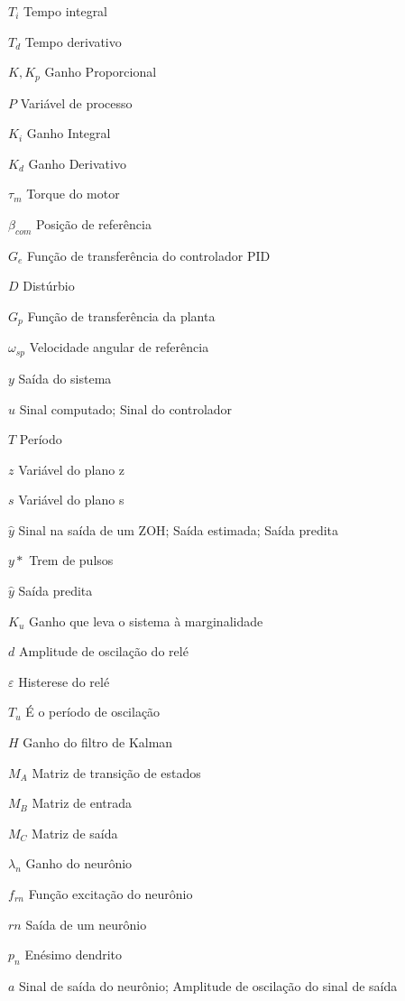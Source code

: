 \begin{simbolos}
  \item[$T_i$] Tempo integral
  \item[$T_d$] Tempo derivativo
  \item[$K, K_p$] Ganho Proporcional
  \item[$P$] Variável de processo
  \item[$K_i$] Ganho Integral
  \item[$K_d$] Ganho Derivativo
  \item[$\tau_m$] Torque do motor
  \item[$\beta_{com}$] Posição de referência
  \item[$G_e$] Função de transferência do controlador PID
  \item[$D$] Distúrbio
  \item[$G_p$] Função de transferência da planta
  \item[$\omega_{sp}$] Velocidade angular de referência
  \item[$y$] Saída do sistema
  \item[$u$] Sinal computado; Sinal do controlador
  \item[$T$] Período
  \item[$z$] Variável do plano z
  \item[$s$] Variável do plano s
  \item[$\hat{y}$] Sinal na saída de um ZOH; Saída estimada; Saída predita
  \item[$y*$] Trem de pulsos
  \item[$\hat{y}$] Saída predita
  \item[$K_u$] Ganho que leva o sistema à marginalidade
  \item[$d$] Amplitude de oscilação do relé
  \item[$\varepsilon$] Histerese do relé
  \item[$T_u$] É o período de oscilação
  \item[$H$] Ganho do filtro de Kalman
  \item[$M_A$] Matriz de transição de estados
  \item[$M_B$] Matriz de entrada
  \item[$M_C$] Matriz de saída
  \item[$\lambda_n$] Ganho do neurônio
  \item[$f_{rn}$] Função excitação do neurônio
  \item[$rn$] Saída de um neurônio
  \item[$p_n$] Enésimo dendrito
  \item[$a$] Sinal de saída do neurônio; Amplitude de oscilação do sinal de saída

\end{simbolos}

